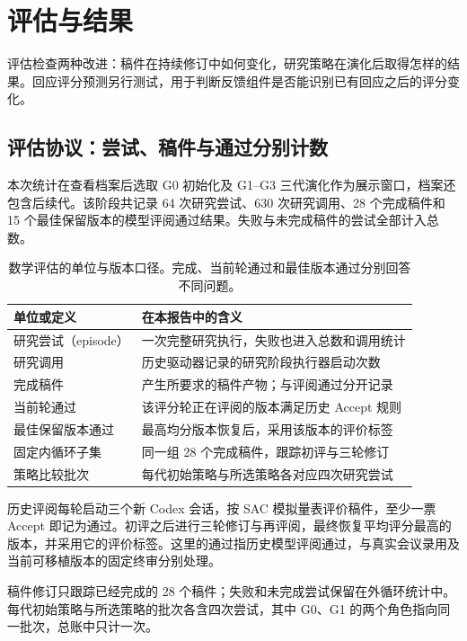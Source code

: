 \FloatBarrier
{}
\section{评估与结果}
\label{sec:evaluation}
评估检查两种改进：稿件在持续修订中如何变化，研究策略在演化后取得怎样的结果。回应评分预测另行测试，用于判断反馈组件是否能识别已有回应之后的评分变化。

\FloatBarrier
\subsection{评估协议：尝试、稿件与通过分别计数}
\label{sec:protocol}
本次统计在查看档案后选取 G0 初始化及 G1--G3 三代演化作为展示窗口，档案还包含后续代。该阶段共记录 64 次研究尝试、630 次研究调用、28 个完成稿件和 15 个最佳保留版本的模型评阅通过结果。失败与未完成稿件的尝试全部计入总数。

\begin{table}[H]
\centering\small
\begin{tabularx}{\textwidth}{P{35mm}Y}
\toprule
{}
\textbf{单位或定义} & \textbf{在本报告中的含义}\\
\midrule
研究尝试（episode） & 一次完整研究执行，失败也进入总数和调用统计\\
研究调用 & 历史驱动器记录的研究阶段执行器启动次数\\
完成稿件 & 产生所要求的稿件产物；与评阅通过分开记录\\
当前轮通过 & 该评分轮正在评阅的版本满足历史 Accept 规则\\
最佳保留版本通过 & 最高均分版本恢复后，采用该版本的评价标签\\
固定内循环子集 & 同一组 28 个完成稿件，跟踪初评与三轮修订\\
策略比较批次 & 每代初始策略与所选策略各对应四次研究尝试\\
\bottomrule
\end{tabularx}
\caption{数学评估的单位与版本口径。完成、当前轮通过和最佳版本通过分别回答不同问题。}
\label{tab:protocol}
\end{table}

历史评阅每轮启动三个新 Codex 会话，按 SAC 模拟量表评价稿件，至少一票 Accept 即记为通过。初评之后进行三轮修订与再评阅，最终恢复平均评分最高的版本，并采用它的评价标签。这里的通过指历史模型评阅通过，与真实会议录用及当前可移植版本的固定终审分别处理。

稿件修订只跟踪已经完成的 28 个稿件；失败和未完成尝试保留在外循环统计中。每代初始策略与所选策略的批次各含四次尝试，其中 G0、G1 的两个角色指向同一批次，总账中只计一次。

